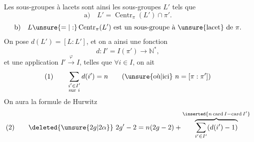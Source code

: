 Les sous-groupes à lacets sont ainsi les  sous-groupes $L'$ tels que
\[
\text{a)}\quad L'=\operatorname{Centr}_{\pi}(L')\cap\pi'.
\]
\[
\text{b)}\quad L\unsure{=|:}\operatorname{Centr}_{\pi}(L')\text{ est un sous-groupe à \unsure{lacet} de }\pi.
\]
On pose $d(L')=[L:L']$, et on a ainsi une fonction
\[
d:I'=I(\pi')\longrightarrow\mathbb N^*,
\]
et une application $I'\xrightarrow{\varphi}I$, telles que $\forall i\in I$, on ait
\[
\text{(1)}\qquad \sum_{\substack{i'\in I'\\\text{sur }i}}d(i')=n
\qquad (\text{\unsure{où|ici}}\ n=[\pi:\pi'])
\]
On aura la formule de Hurwitz
\[
\text{(2)}\qquad \deleted{\unsure{2g|2\alpha}}\ 2g'-2=n(2g-2)+\overbrace{\sum_{i'\in I'}(d(i')-1)}^{\inserted{n\operatorname{card}I-\operatorname{card}I'}}
\]
